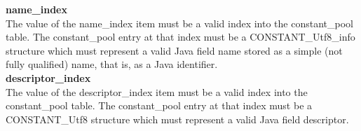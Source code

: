 \begin{appendix}
\textbf{ name\_index} \\
The value of the name\_index item must be a valid index into the constant\_pool table. The constant\_pool entry at that index must be a CONSTANT\_Utf8\_info structure which must represent a valid Java field name stored as a simple (not fully qualified) name, that is, as a Java identifier. \\

\textbf{ descriptor\_index} \\
   The value of the descriptor\_index item must be a valid index into the constant\_pool table. The constant\_pool entry at that index must be a CONSTANT\_Utf8 structure which must represent a valid Java field descriptor.






\end{appendix}
